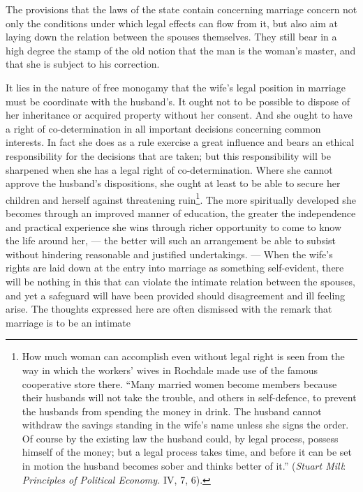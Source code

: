 \documentclass[12pt,a4paper,openany]{book}
\newcommand{\opage}[1]{\marginnote{\footnotesize\textit{[#1]}}}
\begin{document}
The provisions that the laws of the state contain concerning marriage concern not only the conditions under which legal
effects can flow from it, but also aim at laying down the relation between the spouses themselves. They still bear in a
high degree the stamp of the old notion that the man is the woman's master, and that she is subject to his correction.

It lies in the nature of free monogamy that the wife's legal position in marriage must be coordinate with the husband's.
It ought not to be possible to dispose of her inheritance or acquired property without her consent. And she ought to
have a right of co-determination in all important decisions concerning common interests. In fact she does as a rule
exercise a great influence and bears an ethical responsibility for the decisions that are taken; but this responsibility
will be sharpened when she has a legal right of co-determination. Where she cannot approve the husband's dispositions,
she ought at least to be able to secure her children and herself against threatening ruin\footnote[2]{How much woman can
accomplish even without legal right is seen from the way in which the workers' wives in Rochdale made use of the famous
cooperative store there. ``Many married women become members because their husbands will not take the trouble, and
others in self-defence, to prevent the husbands from spending the money in drink. The husband cannot withdraw the
savings standing in the wife's name unless she signs the order. Of course by the existing law the husband could, by
legal process, possess himself of the money; but a legal process takes time, and before it can be set in motion the
husband becomes sober and thinks better of it.''%
(\emph{Stuart Mill}: \textit{Principles of Political Economy.} IV, 7, 6).}. The
\opage{306}more spiritually developed she becomes through an improved manner of education, the greater the independence
and practical experience she wins through richer opportunity to come to know the life around her, --- the better will
such an arrangement be able to subsist without hindering reasonable and justified undertakings. --- When the wife's
rights are laid down at the entry into marriage as something self-evident, there will be nothing in this that can
violate the intimate relation between the spouses, and yet a safeguard will have been provided should disagreement and
ill feeling arise. The thoughts expressed here are often dismissed with the remark that marriage is to be an intimate
\end{document}

